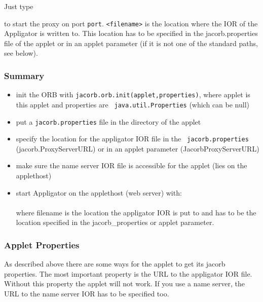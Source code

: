 \documentclass[12pt]{scrbook}
\begin{document}
Just type  


to  start the  proxy  on port  {\tt  port}.  {\tt  <filename>} is  the
location where the IOR of  the Appligator is written to. This location
has to be specified in the  jacorb.properties file of the applet or in
an  applet parameter  (if it  is not  one of  the standard  paths, see
below).

\subsubsection*{Summary}

\begin{itemize}
    \item init the  ORB with {\tt jacorb.orb.init(applet,properties)},
where   applet    is   this    applet   and   properties    are   {\tt
java.util.Properties} (which can be null)
        
    \item put a {\tt jacorb.properties} file in the directory of the applet

    \item specify the location for the appligator IOR file in the {\tt
jacorb.properties} (jacorb.ProxyServerURL)  or in an  applet parameter
(JacorbProxyServerURL)

    \item make sure the name server IOR file is accessible for the applet
      (lies on the applethost)

    \item  start Appligator  on  the applethost  (web server)  with:\\
\\  where filename is  the location the
appligator IOR is  put to and has to be the  location specified in the
jacorb\_properties or applet parameter.
\end{itemize}


\subsubsection*{Applet Properties}

As  described above  there are  some ways  for the  applet to  get its
jacorb  properties.  The  most important  property is  the URL  to the
appligator  IOR  file.  Without  this  property the  applet  will  not
work. If you use a name server,  the URL to the name server IOR has to
be specified too.
\end{document}
